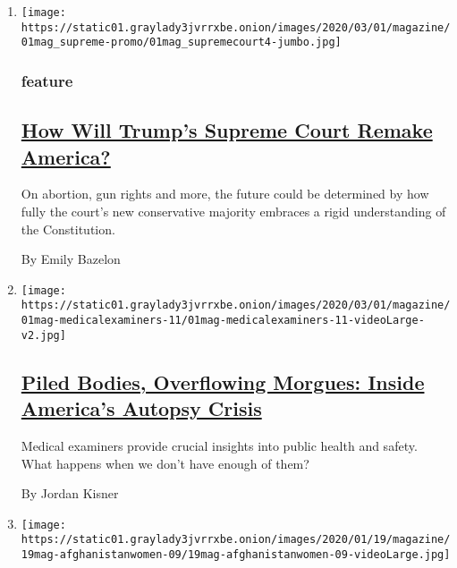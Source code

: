 \begin{enumerate}
\def\labelenumi{\arabic{enumi}.}
\item
  \texttt{[image: https://static01.graylady3jvrrxbe.onion/images/2020/03/01/magazine/01mag\_supreme-promo/01mag\_supremecourt4-jumbo.jpg]}

  \hypertarget{feature}{%
  \subsubsection{feature}\label{feature}}

  \hypertarget{how-will-trumps-supreme-court-remake-america}{%
  \subsection{\texorpdfstring{\href{/2020/02/27/magazine/how-will-trumps-supreme-court-remake-america.html}{How
  Will Trump's Supreme Court Remake
  America?}}{How Will Trump's Supreme Court Remake America?}}\label{how-will-trumps-supreme-court-remake-america}}

  On abortion, gun rights and more, the future could be determined by
  how fully the court's new conservative majority embraces a rigid
  understanding of the Constitution.

  By Emily Bazelon
\item
  \texttt{[image: https://static01.graylady3jvrrxbe.onion/images/2020/03/01/magazine/01mag-medicalexaminers-11/01mag-medicalexaminers-11-videoLarge-v2.jpg]}

  \hypertarget{piled-bodies-overflowing-morgues-inside-americas-autopsy-crisis}{%
  \subsection{\texorpdfstring{\href{/2020/02/25/magazine/piled-bodies-overflowing-morgues-inside-americas-autopsy-crisis.html}{Piled
  Bodies, Overflowing Morgues: Inside America's Autopsy
  Crisis}}{Piled Bodies, Overflowing Morgues: Inside America's Autopsy Crisis}}\label{piled-bodies-overflowing-morgues-inside-americas-autopsy-crisis}}

  Medical examiners provide crucial insights into public health and
  safety. What happens when we don't have enough of them?

  By Jordan Kisner
\item
  \texttt{[image: https://static01.graylady3jvrrxbe.onion/images/2020/01/19/magazine/19mag-afghanistanwomen-09/19mag-afghanistanwomen-09-videoLarge.jpg]}


\end{enumerate}
